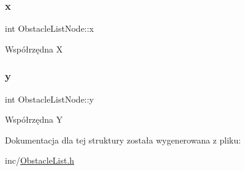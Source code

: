 \subsubsection{\texorpdfstring{x}{x}}
{\footnotesize\ttfamily int Obstacle\+List\+Node\+::x}

Współrzędna X \mbox{\label{struct_obstacle_list_node_a5c26d21bb347f97eadaaeb1f1454959f}} 
\subsubsection{\texorpdfstring{y}{y}}
{\footnotesize\ttfamily int Obstacle\+List\+Node\+::y}

Współrzędna Y 

Dokumentacja dla tej struktury została wygenerowana z pliku\+:\begin{DoxyCompactItemize}
\item 
inc/\mbox{\hyperlink{_obstacle_list_8h}{Obstacle\+List.\+h}}\end{DoxyCompactItemize}
